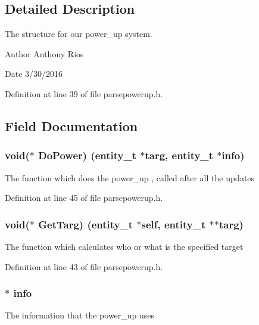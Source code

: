 \subsection{Detailed Description}
The structure for our power\+\_\+up system.

\begin{DoxyAuthor}{Author}
Anthony Rios 
\end{DoxyAuthor}
\begin{DoxyDate}{Date}
3/30/2016 
\end{DoxyDate}


Definition at line 39 of file parsepowerup.\+h.



\subsection{Field Documentation}
\subsubsection[{\texorpdfstring{Do\+Power}{DoPower}}]{\setlength{\rightskip}{0pt plus 5cm}void($\ast$ Do\+Power) ({\bf entity\+\_\+t} $\ast$targ, {\bf entity\+\_\+t} $\ast${\bf info})}\hypertarget{structpower__s_a0547996a48a142c5c5006ce1dd3020a5}{}\label{structpower__s_a0547996a48a142c5c5006ce1dd3020a5}
The function which does the power\+\_\+up , called after all the updates 

Definition at line 45 of file parsepowerup.\+h.

\subsubsection[{\texorpdfstring{Get\+Targ}{GetTarg}}]{\setlength{\rightskip}{0pt plus 5cm}void($\ast$ Get\+Targ) ({\bf entity\+\_\+t} $\ast$self, {\bf entity\+\_\+t} $\ast$$\ast$targ)}\hypertarget{structpower__s_a8e7faa42ca042b4df438d3c82427d2ee}{}\label{structpower__s_a8e7faa42ca042b4df438d3c82427d2ee}
The function which calculates who or what is the specified target 

Definition at line 43 of file parsepowerup.\+h.

\subsubsection[{\texorpdfstring{info}{info}}]{$\ast$ info}\hypertarget{structpower__s_abdbfaddb317fd1c7b9bdd58ea49d0395}{}\label{structpower__s_abdbfaddb317fd1c7b9bdd58ea49d0395}
The information that the power\+\_\+up uses 

